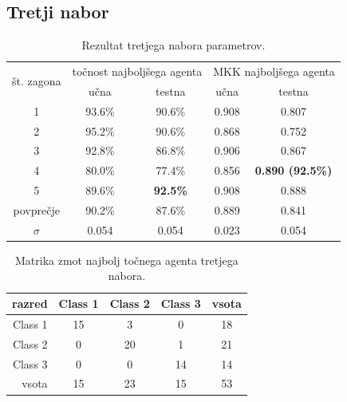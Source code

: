 \subsection{Tretji nabor}\label{subsec:dodatek-wine-tretji-nabor}
\begin{table}[H]
    \begin{center}
        \begin{tabular}{|| c | c c || c c ||}
            \hline
            \multirow{2}{*}{št. zagona} & \multicolumn{2}{c||}{točnost najboljšega agenta} & \multicolumn{2}{c||}{MKK najboljšega agenta} \\ \cline{2-5}
            & učna   & testna          & učna  & testna                  \\
            \hline
            1         & 93.6\% & 90.6\%          & 0.908 & 0.807                   \\
            \hline
            2         & 95.2\% & 90.6\%          & 0.868 & 0.752                   \\
            \hline
            3         & 92.8\% & 86.8\%          & 0.906 & 0.867                   \\
            \hline
            4         & 80.0\% & 77.4\%          & 0.856 & \textbf{0.890 (92.5\%)} \\
            \hline
            5         & 89.6\% & \textbf{92.5\%} & 0.908 & 0.888                   \\
            \hline
            povprečje & 90.2\% & 87.6\%          & 0.889 & 0.841                   \\
            \hline
            $\sigma$  & 0.054  & 0.054           & 0.023 & 0.054                   \\
            \hline
        \end{tabular}
    \end{center}
    \caption{Rezultat tretjega nabora parametrov.}
    \label{tab:wine_result_3}
\end{table}

\begin{table}[H]
    \centering
    \begin{tabular}{||rcccc||}
        \hline
        razred  & Class 1 & Class 2 & Class 3 & vsota \\ \hline
        Class 1 & 15      & 3       & 0       & 18    \\ \hline
        Class 2 & 0       & 20      & 1       & 21    \\ \hline
        Class 3 & 0       & 0       & 14      & 14    \\ \hline
        vsota   & 15      & 23      & 15      & 53    \\ \hline
    \end{tabular}
    \caption{Matrika zmot najbolj točnega agenta tretjega nabora.}
    \label{tab:wine_acc_3}
\end{table}

